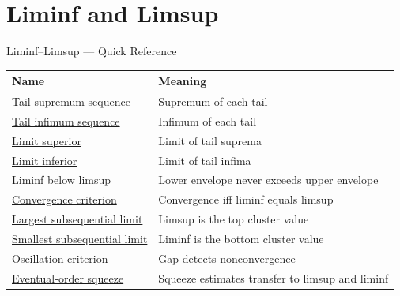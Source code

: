 \section{Liminf and Limsup}

\begin{toolkitbox}{Liminf--Limsup --- Quick Reference}
\small
\begin{tabular}{l l}
\toprule
\textbf{Name} & \textbf{Meaning} \\
\midrule
\hyperref[def:tail-supremum-sequence]{Tail supremum sequence} & Supremum of each tail \\
\hyperref[def:tail-infimum-sequence]{Tail infimum sequence} & Infimum of each tail \\
\hyperref[def:limsup-sequence]{Limit superior} & Limit of tail suprema \\
\hyperref[def:liminf-sequence]{Limit inferior} & Limit of tail infima \\
\hyperref[thm:liminf-below-limsup]{Liminf below limsup} & Lower envelope never exceeds upper envelope \\
\hyperref[thm:convergence-iff-liminf-equals-limsup]{Convergence criterion} & Convergence iff liminf equals limsup \\
\hyperref[thm:limsup-largest-subsequential-limit]{Largest subsequential limit} & Limsup is the top cluster value \\
\hyperref[thm:liminf-smallest-subsequential-limit]{Smallest subsequential limit} & Liminf is the bottom cluster value \\
\hyperref[thm:oscillation-criterion-via-liminf-limsup]{Oscillation criterion} & Gap detects nonconvergence \\
\hyperref[thm:limsup-squeeze-under-eventual-order]{Eventual-order squeeze} & Squeeze estimates transfer to limsup and liminf \\
\bottomrule
\end{tabular}
\end{toolkitbox}


